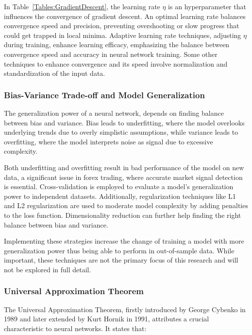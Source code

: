 

In Table~\ref{Tables:GradientDescent}, the learning rate \( \eta \) is an hyperparameter that influences the convergence of gradient descent. An optimal learning rate balances convergence speed and precision, preventing overshooting or slow progress that could get trapped in local minima. Adaptive learning rate techniques, adjusting \( \eta \) during training, enhance learning efficacy, emphasizing the balance between convergence speed and accuracy in neural network training. Some other techniques to enhance convergence and its speed involve normalization and standardization of the input data.

\subsubsection{Bias-Variance Trade-off and Model Generalization}
The generalization power of a neural network, depends on finding balance between bias and variance. Bias leads to underfitting, where the model overlooks underlying trends due to overly simplistic assumptions, while variance leads to overfitting, where the model interprets noise as signal due to excessive complexity.

Both underfitting and overfitting result in bad performance of the model on new data, a significant issue in forex trading, where accurate market signal detection is essential. Cross-validation is employed to evaluate a model's generalization power to independent datasets. Additionally, regularization techniques like L1 and L2 regularization are used to moderate model complexity by adding penalties to the loss function. Dimensionality reduction can further help finding the right balance between bias and variance.

Implementing these strategies increase the change of training a model with more generalization power thus being able to perform in out-of-sample data. While important, these techniques are not the primary focus of this research and will not be explored in full detail.

\subsubsection{Universal Approximation Theorem}
The Universal Approximation Theorem, firstly introduced by George Cybenko in 1989 and later extended by Kurt Hornik in 1991, attributes a crucial characteristic to neural networks. It states that:

